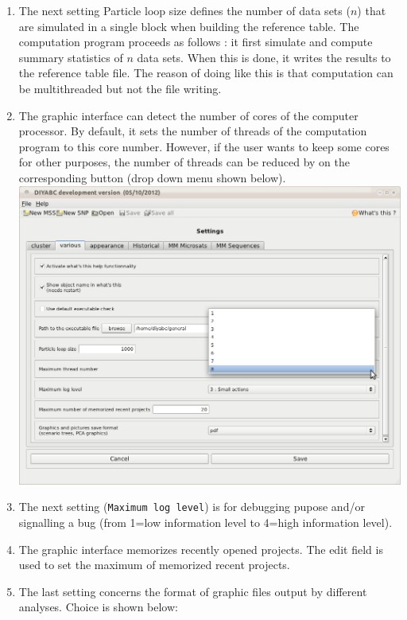 \begin{enumerate}
 \item The next setting \textsf{Particle loop size} defines the number of data sets ($n$) that are simulated in a single block when building the reference table. The computation program proceeds as follows : it first simulate and compute summary statistics of $n$ data sets. When this is done, it writes the results to the reference table file. The reason of doing like this is that computation can be multithreaded but not the file writing.
 \item The graphic interface can detect the number of cores of the computer processor. By default, it sets the number of threads of the computation program to this core number. However, if the user wants to keep some cores for other purposes, the number of threads can be reduced by on the corresponding button (drop down menu shown below).\\
\includegraphics[scale=0.33]{gui_pictures/Capture-DIYABC-95.png} \\
 \item The next setting (\texttt{Maximum log level}) is for debugging pupose and/or signalling a bug (from 1=low information level to 4=high information level).
 \item The graphic interface memorizes recently opened projects. The edit field is used to set the maximum of memorized recent projects.
 \item The last setting concerns the format of graphic files output by different analyses. Choice is shown below:\\

\end{enumerate}
